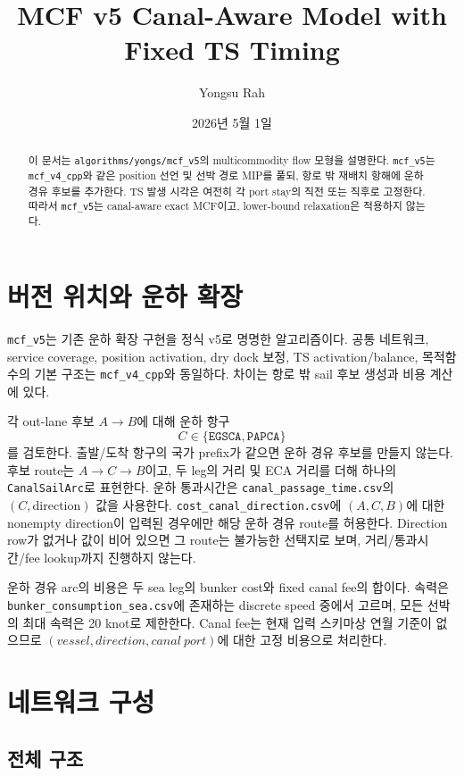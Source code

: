 \documentclass[11pt]{article}
\title{MCF v5 Canal-Aware Model with Fixed TS Timing}
\author{Yongsu Rah}
\date{2026년 5월 1일}
\begin{document}
\maketitle

\begin{abstract}
이 문서는 \texttt{algorithms/yongs/mcf\_v5}의 multicommodity flow 모형을 설명한다.
\texttt{mcf\_v5}는 \texttt{mcf\_v4\_cpp}와 같은 position 선언 및 선박 경로 MIP를 풀되,
항로 밖 재배치 항해에 운하 경유 후보를 추가한다. TS 발생 시각은 여전히 각 port stay의
직전 또는 직후로 고정한다. 따라서 \texttt{mcf\_v5}는 canal-aware exact MCF이고,
lower-bound relaxation은 적용하지 않는다.
\end{abstract}

\section{버전 위치와 운하 확장}

\texttt{mcf\_v5}는 기존 운하 확장 구현을 정식 v5로 명명한 알고리즘이다.
공통 네트워크, service coverage, position activation, dry dock 보정, TS
activation/balance, 목적함수의 기본 구조는 \texttt{mcf\_v4\_cpp}와 동일하다.
차이는 항로 밖 sail 후보 생성과 비용 계산에 있다.

각 out-lane 후보 $A\to B$에 대해 운하 항구
\[
  C\in\{\texttt{EGSCA},\texttt{PAPCA}\}
\]
를 검토한다. 출발/도착 항구의 국가 prefix가 같으면 운하 경유 후보를 만들지 않는다.
후보 route는 $A\to C\to B$이고, 두 leg의 거리 및 ECA 거리를 더해 하나의
\texttt{CanalSailArc}로 표현한다. 운하 통과시간은
\texttt{canal\_passage\_time.csv}의 $(C,\mathrm{direction})$ 값을 사용한다.
\texttt{cost\_canal\_direction.csv}에 $(A,C,B)$에 대한 nonempty direction이
입력된 경우에만 해당 운하 경유 route를 허용한다. Direction row가 없거나 값이 비어
있으면 그 route는 불가능한 선택지로 보며, 거리/통과시간/fee lookup까지 진행하지 않는다.

운하 경유 arc의 비용은 두 sea leg의 bunker cost와 fixed canal fee의 합이다.
속력은 \texttt{bunker\_consumption\_sea.csv}에 존재하는 discrete speed 중에서 고르며,
모든 선박의 최대 속력은 20 knot로 제한한다. Canal fee는 현재 입력 스키마상 연월 기준이
없으므로 $(vessel, direction, canal\ port)$에 대한 고정 비용으로 처리한다.

\section{네트워크 구성}

\subsection{전체 구조}
\end{document}
